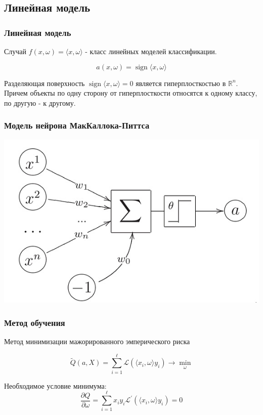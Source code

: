 \documentclass{beamer}
\DeclareMathOperator{\sign}{sign}
\begin{document}
	\subsection{Линейная модель}
	
	\begin{frame}
		\frametitle{Линейная модель}
		
		Случай $f(x, \omega) = \langle x, \omega \rangle$ - класс линейных моделей классификации.
		
		\[
		a(x, \omega) = \sign \langle x, \omega \rangle
		\]
		
		Разделяющая поверхность $\sign \langle x, \omega \rangle = 0$ является гиперплосткостью в $\mathbb{R}^{n}$. Причем объекты по одну сторону от гиперплосткости относятся к одному классу, по другую - к другому.
	\end{frame}
	
	\begin{frame}
		\frametitle{Модель нейрона МакКаллока-Питтса}
				
		\includegraphics[width=\textwidth]{img/mk_pits.jpg}
	\end{frame}
	
	\begin{frame}
		\frametitle{Метод обучения}
		Метод минимизации мажорированного эмперического риска 
		
		\[
		\widetilde{Q}(a, X) = \sum_{i=1}^{\ell} \mathcal{L}(\langle x_i, \omega \rangle y_i) \rightarrow \min_{\omega}
		\]
		
		Необходимое условие минимума:
		\[
		\frac{\partial Q}{\partial \omega} = \sum_{i=1}^{\ell}  x_i y_i \mathcal{L}^{'}(\langle x_i, \omega \rangle y_i) = 0
		\]
	\end{frame}
	
\end{document}
